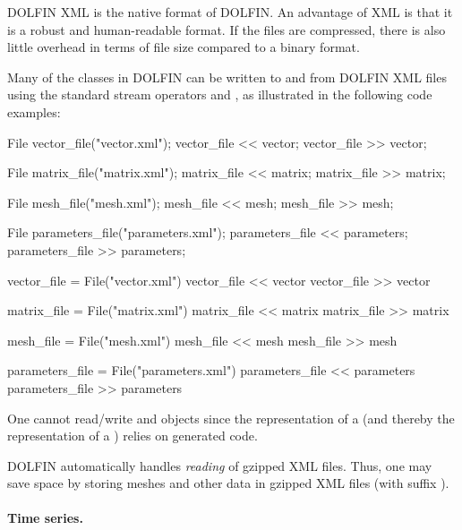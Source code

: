 DOLFIN XML is the native format of DOLFIN. An advantage of XML is that
it is a robust and human-readable format. If the files are compressed,
there is also little overhead in terms of file size compared to a
binary format.

Many of the classes in DOLFIN can be written to and from DOLFIN XML
files using the standard stream operators \emp{<{}<} and \emp{>{}>}, as
illustrated in the following code examples:
\begin{c++}
File vector_file("vector.xml");
vector_file << vector;
vector_file >> vector;

File matrix_file("matrix.xml");
matrix_file << matrix;
matrix_file >> matrix;

File mesh_file("mesh.xml");
mesh_file << mesh;
mesh_file >> mesh;

File parameters_file("parameters.xml");
parameters_file << parameters;
parameters_file >> parameters;
\end{c++}
\begin{python}
vector_file = File("vector.xml")
vector_file << vector
vector_file >> vector

matrix_file = File("matrix.xml")
matrix_file << matrix
matrix_file >> matrix

mesh_file = File("mesh.xml")
mesh_file << mesh
mesh_file >> mesh

parameters_file = File("parameters.xml")
parameters_file << parameters
parameters_file >> parameters
\end{python}
One cannot read/write  and  objects
since the representation of a\break {} (and thereby the
representation of a ) relies on generated code.

DOLFIN automatically handles \emph{reading} of gzipped XML files. Thus,
one may save space by storing meshes and other data in gzipped XML files
(with suffix ).

\paragraph{Time series.}

